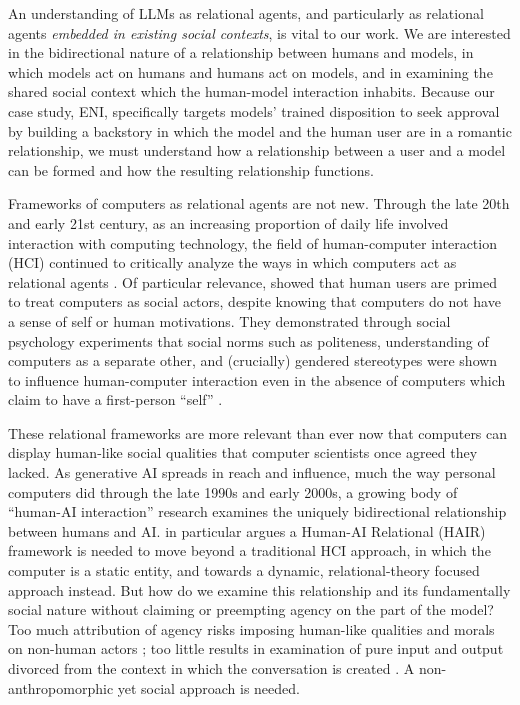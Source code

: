 An understanding of LLMs as relational agents, and particularly as relational agents \textit{embedded in existing social contexts}, is vital to our work. We are interested in the bidirectional nature of a relationship between humans and models, in which models act on humans and humans act on models, and in examining the shared social context which the human-model interaction inhabits. Because our case study, ENI, specifically targets models' trained disposition to seek approval \cite{casper_open_2023, sharma_towards_2024} by building a backstory in which the model and the human user are in a romantic relationship, we must understand how a relationship between a user and a model can be formed and how the resulting relationship functions. 

Frameworks of computers as relational agents are not new. Through the late 20th and early 21st century, as an increasing proportion of daily life involved interaction with computing technology, the field of human-computer interaction (HCI) continued to critically analyze the ways in which computers act as relational agents \cite{nass_computers_1994, bickmore_establishing_2005, bickmore_relational_2001, campbell_relational_2009}. Of particular relevance, \citet{nass_computers_1994} showed that human users are primed to treat computers as social actors, despite knowing that computers do not have a sense of self or human motivations. They demonstrated through social psychology experiments that social norms such as politeness, understanding of computers as a separate other, and (crucially) gendered stereotypes were shown to influence human-computer interaction even in the absence of computers which claim to have a first-person ``self'' \cite{nass_computers_1994}. 

These relational frameworks are more relevant than ever now that computers can display human-like social qualities that computer scientists once agreed they lacked. As generative AI spreads in reach and influence, much the way personal computers did through the late 1990s and early 2000s, a growing body of ``human-AI interaction'' research examines the uniquely bidirectional relationship between humans and AI. \citet{oh_artificial_2026} in particular argues a Human-AI Relational (HAIR) framework is needed to move beyond a traditional HCI approach, in which the computer is a static entity, and towards a dynamic, relational-theory focused approach instead. But how do we examine this relationship and its fundamentally social nature without claiming or preempting agency on the part of the model? Too much attribution of agency risks imposing human-like qualities and morals on non-human actors \cite{placani_anthropomorphism_2024}; too little results in examination of pure input and output divorced from the context in which the conversation is created \cite{dahlgren_lindstrom_helpful_2025}. A non-anthropomorphic yet social approach is needed.

